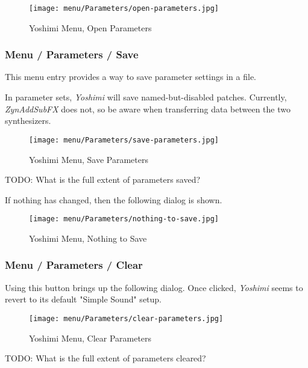 \begin{figure}[H]
   \centering 
   \texttt{[image: menu/Parameters/open-parameters.jpg]}
   \caption{Yoshimi Menu, Open Parameters}
   \label{fig:yoshimi_menu_open_parameters}
\end{figure}

\subsubsection{Menu / Parameters / Save}
\label{subsubsec:menu_parameters_save}

   This menu entry provides a way to save parameter settings in
   a file.

   In parameter sets, \textsl{Yoshimi} will save named-but-disabled patches.
   Currently, \textsl{ZynAddSubFX} does not, so be aware when transferring
   data between the two synthesizers.

\begin{figure}[H]
   \centering 
   \texttt{[image: menu/Parameters/save-parameters.jpg]}
   \caption{Yoshimi Menu, Save Parameters}
   \label{fig:yoshimi_menu_save_parameters}
\end{figure}

   TODO:  What is the full extent of parameters saved?

   If nothing has changed, then the following dialog is shown.

\begin{figure}[H]
   \centering 
   \texttt{[image: menu/Parameters/nothing-to-save.jpg]}
   \caption{Yoshimi Menu, Nothing to Save}
   \label{fig:yoshimi_menu_nothing_to_save_parameters}
\end{figure}

\subsubsection{Menu / Parameters / Clear}
\label{subsubsec:menu_parameters_clear}

   Using this button brings up the following dialog.  Once clicked,
   \textsl{Yoshimi} seems to revert to its default "Simple Sound" setup.

\begin{figure}[H]
   \centering 
   \texttt{[image: menu/Parameters/clear-parameters.jpg]}
   \caption{Yoshimi Menu, Clear Parameters}
   \label{fig:yoshimi_menu_clear_parameters}
\end{figure}

   TODO:  What is the full extent of parameters cleared?

